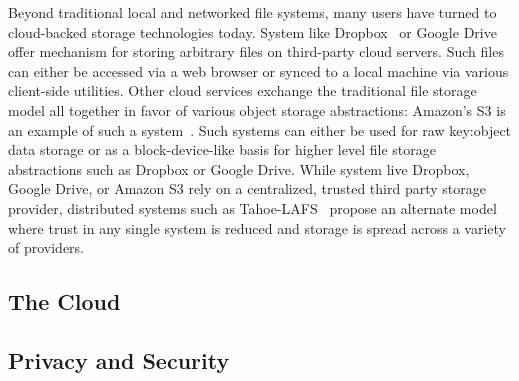Beyond traditional local and networked file systems, many users have
turned to cloud-backed storage technologies today. System like
Dropbox~\cite{dropbox} or Google Drive~\cite{google-drive} offer
mechanism for storing arbitrary files on third-party cloud
servers. Such files can either be accessed via a web browser or synced
to a local machine via various client-side utilities. Other cloud
services exchange the traditional file storage model all together in
favor of various object storage abstractions: Amazon's S3 is an
example of such a system~\cite{amazon-s3}. Such systems can either be
used for raw key:object data storage or as a block-device-like basis
for higher level file storage abstractions such as Dropbox or Google
Drive. While system live Dropbox, Google Drive, or Amazon S3 rely on a
centralized, trusted third party storage provider, distributed systems
such as Tahoe-LAFS~\cite{Wilcox-O'Hearn2008} propose an alternate
model where trust in any single system is reduced and storage is
spread across a variety of providers.

\subsection{The Cloud}



\subsection{Privacy and Security}

